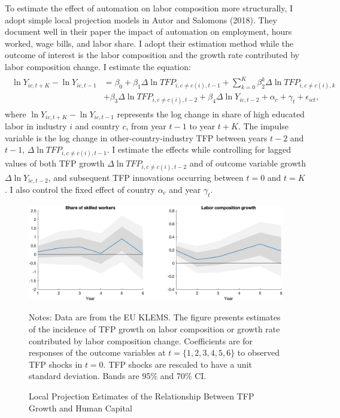 \documentclass[12pt]{article}
\begin{document}
To estimate the effect of automation on labor composition more structurally, I adopt simple local projection models in Autor and Salomons (2018)\nocite{AutorSalomons2018}. They document well in their paper the impact of automation on employment, hours worked, wage bills, and labor share. I adopt their estimation method while the outcome of interest is the labor composition and the growth rate contributed by labor composition change. I estimate the equation: 
\begin{align}
\begin{split}
\ln Y_{i c, t+K}-\ln Y_{i c, t-1}&=\beta_{0}+\beta_{1} \Delta \ln TFP_{i, c \neq c(i), t-1}+\sum_{k=0}^{K} \beta_{2}^{k} \Delta \ln TFP_{i, c \neq c(i), k} \\
&+\beta_{3} \Delta \ln T F P_{i, c \neq c(i), t-2}+\beta_{4} \Delta \ln Y_{i c, t-2}+\alpha_{c}+\gamma_{t}+\epsilon_{ict},
\end{split}
\end{align}
where $\ln Y_{i c, t+K}-\ln Y_{i c, t-1}$ represents the log change in share of high educated labor in industry $i$ and country $c$, from year $t-1$ to year $t+K$. The impulse variable is the log change in other-country-industry TFP between years $t-2$ and $t-1$, $\Delta \ln TFP_{i, c \neq c(i), t-1}$. I estimate the effects while controlling for lagged values of both TFP growth $\Delta \ln TFP_{i, c \neq c(i), t-2}$ and of outcome variable growth $\Delta \ln Y_{ic, t-2}$, and subsequent TFP innovations occurring between $t=0$ and $t=K$. I also control the fixed effect of country $\alpha_{c}$ and year $\gamma_{t}$. 

\begin{figure}[h!]
\includegraphics[width = \textwidth]{LP}
\caption{Local Projection Estimates of the Relationship Between TFP Growth and Human Capital}
\label{LP}
{\scriptsize Notes: Data are from the EU KLEMS. The figure presents estimates of the incidence of TFP growth on labor composition or growth rate contributed by labor composition change. Coefficients are for responses of the outcome variables at $t = \{1,2,3,4,5,6\}$ to observed TFP shocks in $t = 0$. TFP shocks are rescaled to have a unit standard deviation. Bands are 95\% and 70\% CI.}
\end{figure}
\end{document}
